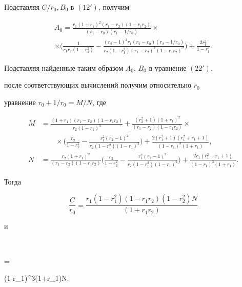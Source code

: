 Подставляя $C/r_0,B_0$ в $(12')$, получим


\begin{multline}


A_0=\frac {r_1(1+r_1)^2(r_1-r_2)(1-r_1r_2)}{(r_1-r_0)(r_1- 1/r_0)}\times \\


%


\times\biggl(\frac 1{r_1r_2(1-r_1^2)} -\frac {(r_2-1)^2r_1(r_2-r_0)


(r_2- 1/r_0)}{r_2(1-r_1^2)(r_1-r_2)^2(1-r_1r_2)^2} \biggr)


+ \frac {2r_1^2}{1-r_1^2}.


\end{multline}


Подставляя найденные таким образом $A_0$, $B_0$ в уравнение $(22')$,


после соответствующих вычислений получим относительно $r_0$


уравнение $r_0 + 1/r_0=M/N$, где


\begin{align*}


M&=\frac {(1+r_1)(r_1-r_2)(1-r_1r_2)}{r_2(1-r_1)^3} +


\frac{(r_2^2+1)(1+r_1)^2}{(r_1-r_2)(1-r_1r_2)}\times \\


&\qquad\times \biggl( \frac {r_2}{1-r_2^2} -


\frac {r_1^2(r_2-1)^2}{r_2(1-r_1^2)(1-r_1)^2} \biggr) +


\frac {2(r_1^2+1)(r_1^2+r_1+1)}{(1-r_1)^3(1+r_1)}, \\


%


N&=\frac {r_2(1+r_1)^2}{(r_1-r_2)(1-r_1r_2)} \biggl(


\frac{r_2}{1-r_2^2}-\frac {r_1^2(r_2-1)^2}{r_2(1-r_1^2)(1-r_1)^2} \biggr)+


\frac {2r_1(r_1^2+r_1+1)}{(1-r_1)^3(1+r_1)}.


\end{align*}


Тогда


$$


\frac C{r_0}=\frac {r_1(1-r_1^2)(1-r_1r_2)(1-r_2^2)N}{(1+r_1r_2)}


$$


и


$$


=


{(1-r_1)^3(1+r_1)N}.


